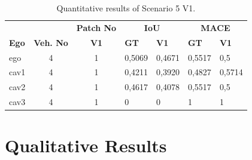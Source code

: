 \begin{table}[tph]
    \centering
    \caption{Quantitative results of Scenario 5 V1.}
    \label{tab:scenario5v1_results}
    \begin{tabularx}{\textwidth}{l c c *{4}{X}}
        \toprule
                         &             & \multicolumn{1}{c}{\textbf{Patch No}} & \multicolumn{2}{c}{\textbf{IoU}} & \multicolumn{2}{c}{\textbf{MACE}}                   \\
        \cmidrule(lr){4-5}\cmidrule(lr){6-7}
        \textbf{Ego}     &
        \textbf{Veh. No} &
        \textbf{V1}      &
        \textbf{GT}      & \textbf{V1} &
        \textbf{GT}      & \textbf{V1}                                                                                                                                  \\
        \midrule
        ego              & 4           & 1                                     & 0,5069                           & 0,4671                            & 0,5517 & 0,5    \\
        cav1             & 4           & 1                                     & 0,4211                           & 0,3920                            & 0,4827 & 0,5714 \\
        cav2             & 4           & 1                                     & 0,4617                           & 0,4078                            & 0,5517 & 0,5    \\
        cav3             & 4           & 1                                     & 0                                & 0                                 & 1      & 1      \\
        \bottomrule
    \end{tabularx}
\end{table}
\section{Qualitative Results}
\label{sec:qualitative_results}

